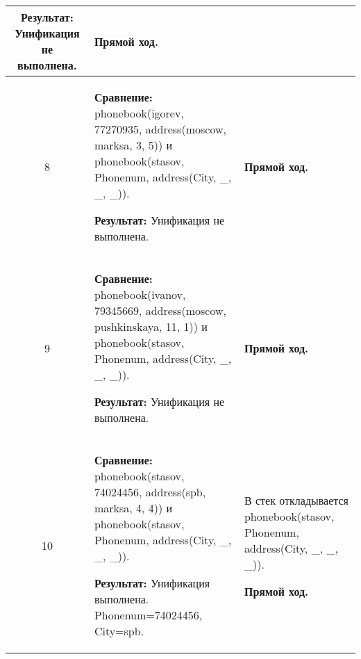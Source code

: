 \begin{longtable}{|c|p{}|p{}|}
    \textbf{Результат:} \newline
    Унификация не выполнена.
                       &
    \textbf{Прямой ход.}
                       \\ \hline

    8
                       &
\textbf{Сравнение:} \newline
  phonebook(igorev, 77270935,
            address(moscow,    marksa,       3,  5))
    \newline и \newline
    phonebook(stasov, Phonenum, address(City, \_, \_, \_)).
    \newline

    \textbf{Результат:} \newline
    Унификация не выполнена.
                       &
    \textbf{Прямой ход.}
                       \\ \hline

    9
                       &
\textbf{Сравнение:} \newline
  phonebook(ivanov, 79345669,
            address(moscow,    pushkinskaya, 11, 1))
    \newline и \newline
    phonebook(stasov, Phonenum, address(City, \_, \_, \_)).
    \newline

    \textbf{Результат:} \newline
    Унификация не выполнена.
                       &
    \textbf{Прямой ход.}
                       \\ \hline

    10
                       &
\textbf{Сравнение:} \newline
  phonebook(stasov, 74024456,
            address(spb,       marksa,       4,  4))
    \newline и \newline
    phonebook(stasov, Phonenum, address(City, \_, \_, \_)).
    \newline

    \textbf{Результат:} \newline
    Унификация выполнена.\newline{}
    Phonenum=74024456, City=spb.
                       &
    В стек откладывается\newline
    phonebook(stasov, Phonenum, address(City, \_, \_, \_)).
    \newline

    \textbf{Прямой ход.}
                       \\ \hline


\end{longtable}
